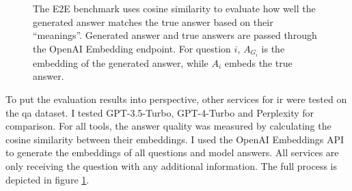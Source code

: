 \documentclass[../main.tex]{subfiles}
\begin{document}
\begin{figure}[t]
    \centering
    \caption{The E2E benchmark uses cosine similarity to evaluate how
        well the generated answer matches the true answer based on their ``meanings''.
        Generated answer and true answers are passed through the OpenAI Embedding
        endpoint. For question $i$, $A_{G_i}$ is the embedding of the generated answer,
        while $A_i$ embeds the true answer.}
    \label{fig:benchmark}
\end{figure}

To put the evaluation results into perspective,
other services for \gls{ir} were tested on the \gls{qa} dataset.
I tested GPT-3.5-Turbo, GPT-4-Turbo and Perplexity for comparison.
For all tools, the answer quality was measured
by calculating the cosine similarity between their embeddings.
I used the OpenAI Embeddings API \cite{zotero-253} to generate the embeddings of all questions and model answers.
All services are only receiving the question with any additional information.
The full process is depicted in figure \ref{fig:benchmark}.
\end{document}
